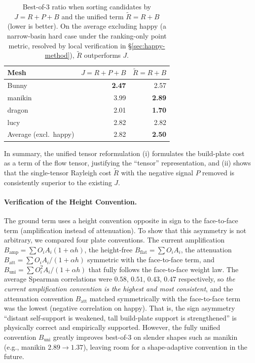 \documentclass[11pt,a4paper]{article}
\begin{document}
\begin{table}[H]
\centering
\caption{Best-of-3 ratio when sorting candidates by $J=R+P+B$ and the unified term $\tilde R=R+B$ (lower is better).
On the average excluding happy (a narrow-basin hard case under the ranking-only point metric, resolved by local
verification in \S\ref{sec:happy-method}), $\tilde R$ outperforms $J$.}
\label{tab:unified-b3}
\begin{tabular}{lrr}
\toprule
Mesh & $J=R{+}P{+}B$ & $\tilde R=R{+}B$\\
\midrule
Bunny   & \textbf{2.47} & 2.57\\
manikin & 3.99 & \textbf{2.89}\\
dragon  & 2.01 & \textbf{1.70}\\
lucy    & 2.82 & 2.82\\
\midrule
Average (excl.\ happy) & 2.82 & \textbf{2.50}\\
\bottomrule
\end{tabular}
\end{table}

In summary, the unified tensor reformulation (i) formulates the build-plate cost as a term of the flow tensor,
justifying the ``tensor'' representation, and (ii) shows that the single-tensor Rayleigh cost $\tilde R$ with the negative signal $P$ removed
is consistently superior to the existing $J$.

\paragraph{Verification of the Height Convention.}
The ground term uses a height convention opposite in sign to the face-to-face term (amplification instead of attenuation).
To show that this asymmetry is not arbitrary, we compared four plate conventions.
The current amplification $B_{\mathrm{amp}}=\sum O_iA_i(1+\alpha h)$,
the height-free $B_{\mathrm{flat}}=\sum O_iA_i$,
the attenuation $B_{\mathrm{att}}=\sum O_iA_i/(1+\alpha h)$ symmetric with the face-to-face term,
and $B_{\mathrm{uni}}=\sum O_i^2A_i/(1+\alpha h)$ that fully follows the face-to-face weight law.
The average Spearman correlations were $0.58$, $0.51$, $0.43$, $0.47$ respectively,
so \emph{the current amplification convention is the highest and most consistent},
and the attenuation convention $B_{\mathrm{att}}$ matched symmetrically with the face-to-face term was the lowest (negative correlation on happy).
That is, the sign asymmetry ``distant self-support is weakened, tall build-plate support is strengthened''
is physically correct and empirically supported.
However, the fully unified convention $B_{\mathrm{uni}}$ greatly improves best-of-3 on slender shapes such as manikin
(e.g., manikin $2.89\to1.37$), leaving room for a shape-adaptive convention in the future.
\end{document}

